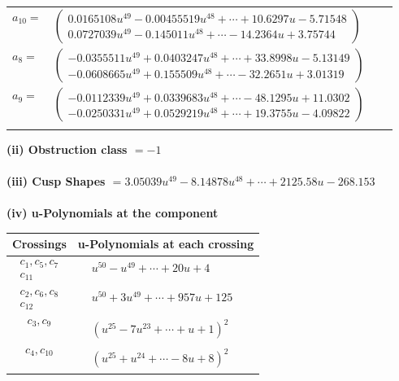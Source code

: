 \documentclass[1p]{elsarticle_modified}
\theoremstyle{definition}
\begin{document}
\begin{tabular}{m{7pt} m{180pt} m{7pt} m{180pt} }
\flushright $a_{10}=$&$\begin{pmatrix}0.0165108 u^{49}-0.00455519 u^{48}+\cdots+10.6297 u-5.71548\\0.0727039 u^{49}-0.145011 u^{48}+\cdots-14.2364 u+3.75744\end{pmatrix}$ \\
\flushright $a_{8}=$&$\begin{pmatrix}-0.0355511 u^{49}+0.0403247 u^{48}+\cdots+33.8998 u-5.13149\\-0.0608665 u^{49}+0.155509 u^{48}+\cdots-32.2651 u+3.01319\end{pmatrix}$ \\
\flushright $a_{9}=$&$\begin{pmatrix}-0.0112339 u^{49}+0.0339683 u^{48}+\cdots-48.1295 u+11.0302\\-0.0250331 u^{49}+0.0529219 u^{48}+\cdots+19.3755 u-4.09822\end{pmatrix}$\\&\end{tabular}
\flushleft \textbf{(ii) Obstruction class $= -1$}\\~\\
\flushleft \textbf{(iii) Cusp Shapes $= 3.05039 u^{49}-8.14878 u^{48}+\cdots+2125.58 u-268.153$}\\~\\
\newpage\renewcommand{\arraystretch}{1}
\flushleft \textbf{(iv) u-Polynomials at the component}\newline \\
\begin{tabular}{m{50pt}|m{274pt}}
Crossings & \hspace{64pt}u-Polynomials at each crossing \\
\hline $$\begin{aligned}c_{1},c_{5},c_{7}\\c_{11}\end{aligned}$$&$\begin{aligned}
&u^{50}- u^{49}+\cdots+20 u+4
\end{aligned}$\\
\hline $$\begin{aligned}c_{2},c_{6},c_{8}\\c_{12}\end{aligned}$$&$\begin{aligned}
&u^{50}+3 u^{49}+\cdots+957 u+125
\end{aligned}$\\
\hline $$\begin{aligned}c_{3},c_{9}\end{aligned}$$&$\begin{aligned}
&(u^{25}-7 u^{23}+\cdots+u+1)^{2}
\end{aligned}$\\
\hline $$\begin{aligned}c_{4},c_{10}\end{aligned}$$&$\begin{aligned}
&(u^{25}+u^{24}+\cdots-8 u+8)^{2}
\end{aligned}$\\
\hline
\end{tabular}\\~\\
\end{document}
